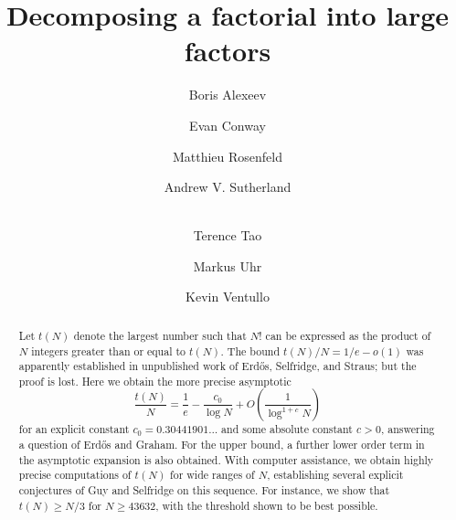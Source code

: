 \documentclass[10pt,a4paper,reqno]{amsart}
\numberwithin{equation}{section}
\theoremstyle{plain}
\theoremstyle{definition}
\begin{document}
\title{Decomposing a factorial into large factors}

\author[Alexeev]{Boris Alexeev}
\address{Unaffiliated, Athens, GA 30605.}

\author[Conway]{Evan Conway}
\address{UVA Department of Mathematics, Charlottesville, VA 22903.}

\author[Rosenfeld]{Matthieu Rosenfeld}
\address{LIRMM, Univ Montpellier, CNRS, Montpellier, France.}

\author[Sutherland]{Andrew V. Sutherland}
\address{MIT Department of Mathematics, Cambridge, MA 02139.}

\author[Tao]{\\Terence Tao}
\address{UCLA Department of Mathematics, Los Angeles, CA 90095-1555.}

\author[Uhr]{Markus Uhr}
\address{Unaffiliated, Zurich, Switzerland.}

\author[Ventullo]{Kevin Ventullo}
\address{Google, Mountain View, CA.}



\begin{abstract}  Let $t(N)$ denote the largest number such that $N!$ can be expressed as the product of $N$ integers greater than or equal to $t(N)$.
The bound $t(N)/N = 1/e-o(1)$ was apparently established in unpublished work of Erd\H{o}s, Selfridge, and Straus; but the proof is lost.  Here we obtain the more precise asymptotic
$$ \frac{t(N)}{N} = \frac{1}{e} - \frac{c_0}{\log N} + O\left( \frac{1}{\log^{1+c} N} \right)$$
for an explicit constant $c_0 = 0.30441901\dots$ and some absolute constant $c>0$, answering a question of Erd\H{o}s and Graham.  For the upper bound, a further lower order term in the asymptotic expansion is also obtained.  With computer assistance, we obtain highly precise computations of $t(N)$ for wide ranges of $N$, establishing several explicit conjectures of Guy and Selfridge on this sequence.  For instance, we show that $t(N) \geq N/3$ for $N \geq 43632$, with the threshold shown to be best possible.
\end{abstract}


\maketitle
\end{document}
